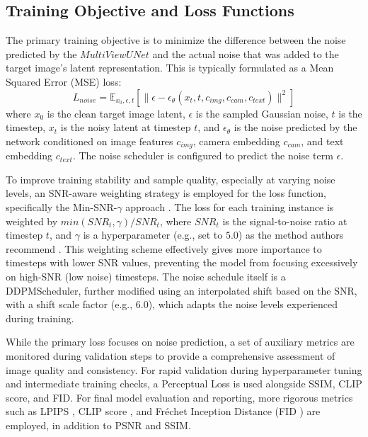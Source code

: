 \subsection{Training Objective and Loss Functions}
The primary training objective is to minimize the difference between the noise predicted by the $MultiViewUNet$ and the actual noise that was added to the target image's latent representation. This is typically formulated as a Mean Squared Error (MSE) loss:
\[ L_{noise} = \mathbb{E}_{x_0, \epsilon, t} [\| \epsilon - \epsilon_\theta(x_t, t, c_{img}, c_{cam}, c_{text}) \|^2] \]
where $x_0$ is the clean target image latent, $\epsilon$ is the sampled Gaussian noise, $t$ is the timestep, $x_t$ is the noisy latent at timestep $t$, and $\epsilon_\theta$ is the noise predicted by the network conditioned on image features $c_{img}$, camera embedding $c_{cam}$, and text embedding $c_{text}$.
The noise scheduler is configured to predict the noise term $\epsilon$.

To improve training stability and sample quality, especially at varying noise levels, an SNR-aware weighting strategy is employed for the loss function, specifically the Min-SNR-$\gamma$ approach \cite{minsnr}. The loss for each training instance is weighted by $min(SNR_t, \gamma) / SNR_t$, where $SNR_t$ is the signal-to-noise ratio at timestep $t$, and $\gamma$ is a hyperparameter (e.g., set to $5.0$) as the method authors recommend \cite{minsnr}. This weighting scheme effectively gives more importance to timesteps with lower SNR values, preventing the model from focusing excessively on high-SNR (low noise) timesteps. The noise schedule itself is a DDPMScheduler, further modified using an interpolated shift based on the SNR, with a shift scale factor (e.g., $6.0$), which adapts the noise levels experienced during training.

While the primary loss focuses on noise prediction, a set of auxiliary metrics are monitored during validation steps to provide a comprehensive assessment of image quality and consistency. For rapid validation during hyperparameter tuning and intermediate training checks, a Perceptual Loss is used alongside SSIM, CLIP score, and FID. For final model evaluation and reporting, more rigorous metrics such as LPIPS \cite{lpips}, CLIP score \cite{clipscore}, and Fréchet Inception Distance (FID \cite{fid1, fid2}) are employed, in addition to PSNR and SSIM.

